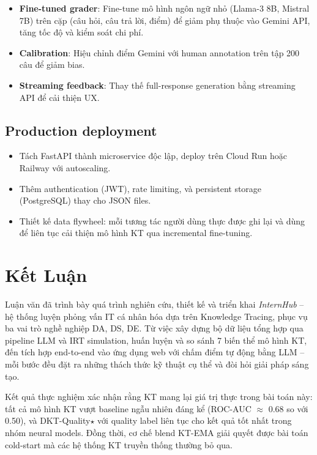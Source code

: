 \documentclass[12pt, a4paper]{report}
\newcommand{\system}{\textit{InternHub}}
\begin{document}
\begin{itemize}
  \item \textbf{Fine-tuned grader}: Fine-tune mô hình ngôn ngữ nhỏ (Llama-3 8B, Mistral 7B) trên cặp (câu hỏi, câu trả lời, điểm) để giảm phụ thuộc vào Gemini API, tăng tốc độ và kiểm soát chi phí.
  \item \textbf{Calibration}: Hiệu chỉnh điểm Gemini với human annotation trên tập 200 câu để giảm bias.
  \item \textbf{Streaming feedback}: Thay thế full-response generation bằng streaming API để cải thiện UX.
\end{itemize}

\subsection{Production deployment}

\begin{itemize}
  \item Tách FastAPI thành microservice độc lập, deploy trên Cloud Run hoặc Railway với autoscaling.
  \item Thêm authentication (JWT), rate limiting, và persistent storage (PostgreSQL) thay cho JSON files.
  \item Thiết kế data flywheel: mỗi tương tác người dùng thực được ghi lại và dùng để liên tục cải thiện mô hình KT qua incremental fine-tuning.
\end{itemize}

\section{Kết Luận}
\label{sec:final_conclusion}

Luận văn đã trình bày quá trình nghiên cứu, thiết kế và triển khai \system{} -- hệ thống luyện phỏng vấn IT cá nhân hóa dựa trên Knowledge Tracing, phục vụ ba vai trò nghề nghiệp DA, DS, DE. Từ việc xây dựng bộ dữ liệu tổng hợp qua pipeline LLM và IRT simulation, huấn luyện và so sánh 7 biến thể mô hình KT, đến tích hợp end-to-end vào ứng dụng web với chấm điểm tự động bằng LLM -- mỗi bước đều đặt ra những thách thức kỹ thuật cụ thể và đòi hỏi giải pháp sáng tạo.

Kết quả thực nghiệm xác nhận rằng KT mang lại giá trị thực trong bài toán này: tất cả mô hình KT vượt baseline ngẫu nhiên đáng kể (ROC-AUC $\approx$ 0.68 so với 0.50), và DKT-Quality$\star$ với quality label liên tục cho kết quả tốt nhất trong nhóm neural models. Đồng thời, cơ chế blend KT-EMA giải quyết được bài toán cold-start mà các hệ thống KT truyền thống thường bỏ qua.
\end{document}
